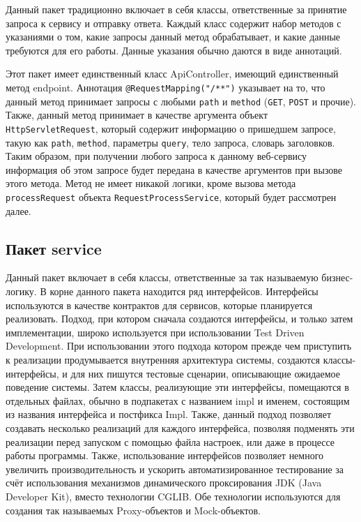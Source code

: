 Данный пакет традиционно включает в себя классы, ответственные за принятие запроса к сервису и отправку ответа.
Каждый класс содержит набор методов с указаниями о том, какие запросы данный метод обрабатывает, и какие данные требуются для его работы.
Данные указания обычно даются в виде аннотаций.

Этот пакет имеет единственный класс ApiController, имеющий единственный метод endpoint.
Аннотация \texttt{@RequestMapping("/**")} указывает на то, что данный метод принимает запросы с любыми \texttt{path} и \texttt{method} (\texttt{GET}, \texttt{POST} и прочие).
Также, данный метод принимает в качестве аргумента объект \texttt{HttpServletRequest}, который содержит информацию о пришедшем запросе, такую как \texttt{path}, \texttt{method}, параметры \texttt{query}, тело запроса, словарь заголовков.
Таким образом, при получении любого запроса к данному веб-сервису информация об этом запросе будет передана в качестве аргументов при вызове этого метода.
Метод не имеет никакой логики, кроме вызова метода \texttt{processRequest} объекта \texttt{RequestProcessService}, который будет рассмотрен далее.

\subsection{Пакет service}\label{subsec:package-service}

Данный пакет включает в себя классы, ответственные за так называемую бизнес-логику.
В корне данного пакета находится ряд интерфейсов.
Интерфейсы используются в качестве контрактов для сервисов, которые планируется реализовать.
Подход, при котором сначала создаются интерфейсы, и только затем имплементации, широко используется при использовании Test Driven Development.
При использовании этого подхода котором прежде чем приступить к реализации продумывается внутренняя архитектура системы, создаются классы-интерфейсы, и для них пишутся тестовые сценарии, описывающие ожидаемое поведение системы.
Затем классы, реализующие эти интерфейсы, помещаются в отдельных файлах, обычно в подпакетах с названием impl и именем, состоящим из названия интерфейса и постфикса Impl.
Также, данный подход позволяет создавать несколько реализаций для каждого интерфейса, позволяя подменять эти реализации перед запуском с помощью файла настроек, или даже в процессе работы программы.
Также, использование интерфейсов позволяет немного увеличить производительность и ускорить автоматизированное тестирование за счёт использования механизмов динамического проксирования JDK (Java Developer Kit), вместо технологии CGLIB\@.
Обе технологии используются для создания так называемых Proxy-объектов и Mock-объектов.

